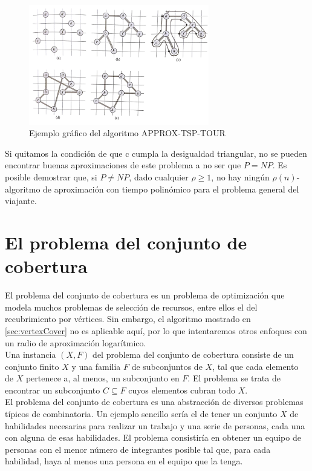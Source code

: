 \documentclass{article}
\begin{document}
\begin{figure}[H]
  \centering
    \includegraphics[width=0.7\textwidth]{TSP}
  \caption{Ejemplo gráfico del algoritmo APPROX-TSP-TOUR}
\end{figure}
	
Si quitamos la condición de que c cumpla la desigualdad triangular, no se pueden encontrar buenas aproximaciones de este problema a no ser que $P = NP$. Es posible demostrar que, si $P \neq NP$, dado cualquier $\rho \geq 1$, no hay ningún $\rho(n)$-algoritmo de aproximación con tiempo polinómico para el problema general del viajante.

\section{El problema del conjunto de cobertura}
El problema del conjunto de cobertura es un problema de optimización que modela muchos problemas de selección de recursos, entre ellos el del recubrimiento por vértices. Sin embargo, el algoritmo mostrado en \ref{sec:vertexCover} no es aplicable aquí, por lo que intentaremos otros enfoques con un radio de aproximación logarítmico.\\

Una instancia $(X,F)$ del problema del conjunto de cobertura consiste de un conjunto finito $X$ y una familia $F$ de subconjuntos de $X$, tal que cada elemento de $X$ pertenece a, al menos, un subconjunto en $F$. El problema se trata de encontrar un subconjunto $C \subseteq F$ cuyos elementos cubran todo $X$.\\

El problema del conjunto de cobertura es una abstracción de diversos problemas típicos de combinatoria. Un ejemplo sencillo sería el de tener un conjunto $X$ de habilidades necesarias para realizar un trabajo y una serie de personas, cada una con alguna de esas habilidades. El problema consistiría en obtener un equipo de personas con el menor número de integrantes posible tal que, para cada habilidad, haya al menos una persona en el equipo que la tenga.\\
\end{document}
